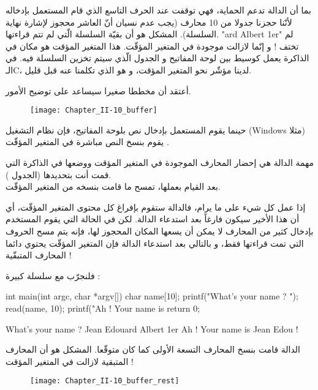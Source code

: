 بما أن الدالة
تدعم الحماية، فهي توقفت عند الحرف التاسع الذي قام المستعمل بإدخاله لأنّنا حجزنا جدولا من 10 محارف (يجب عدم نسيان أنّ العاشر محجوز لإشارة نهاية السلسلة).
المشكل هو أن بقيّة السلسلة الّتي لم تتم قراءتها.
"\textenglish{ard Albert 1er}"
لم تختف ! و إنّما لازالت موجودة في المتغير المؤقّت. هذا المتغير المؤقت هو مكان في الذاكرة يعمل كوسيط بين لوحة المفاتيح و الجدول الّذي سيتم تخزين السلسلة فيه. في الـ\textenglish{C}،
لدينا مؤشّر نحو المتغير المؤقت، و هو
الذي تكلمنا عنه قبل قليل.

أعتقد أن مخططا صغيرا سيساعد على توضيح الأمور.

\begin{figure}[H]
	\centering
	\texttt{[image: Chapter\_II-10\_buffer]}
\end{figure}

حينما يقوم المستعمل بإدخال نص بلوحة المفاتيح، فإن نظام التشغيل 
(\textenglish{Windows}
مثلا) يقوم بنسخ النص مباشرة في المتغير المؤقّت
.

مهمة الدالة
هي إحضار المحارف الموجودة في المتغير المؤقت ووضعها في الذاكرة التي قمت أنت بتحديدها (الجدول
).\\
بعد القيام بعملها، تمسح ما قامت بنسخه من المتغير المؤقّت.

إذا عمل كل شيء على ما يرام، فالدالة
ستقوم بإفراغ كل محتوى المتغير المؤقّت، أي أن هذا الأخير سيكون فارغاً بعد استدعاء الدالة. لكن في الحالة التي يقوم المستخدم بإدخال كثير من المحارف لا يمكن أن يسعها المكان المحجوز لها، فإنه يتم مسح الحروف التي تمت قراءتها فقط، و بالتالي بعد استدعاء الدالة
فإن المتغير المؤقّت يحتوي دائما المحارف المتبقّية !

فلنجرّب مع سلسلة كبيرة :

\begin{Csource}
  int main(int argc, char *argv[])
  {
  	char name[10];
  	printf("What's your name ? ");
  	read(name, 10);
  	printf("Ah ! Your name is %
  	return 0;
  }
\end{Csource}

\begin{Console}
  What's your name ? Jean Edouard Albert 1er
  Ah ! Your name is Jean Edou !
\end{Console}

الدالة
قامت بنسخ المحارف التسعة الأولى كما كان متوقّعا. المشكل هو أن المحارف المتبقية لازالت في المتغير المؤقت !

\begin{figure}[H]
	\centering
	\texttt{[image: Chapter\_II-10\_buffer\_rest]}
\end{figure}

